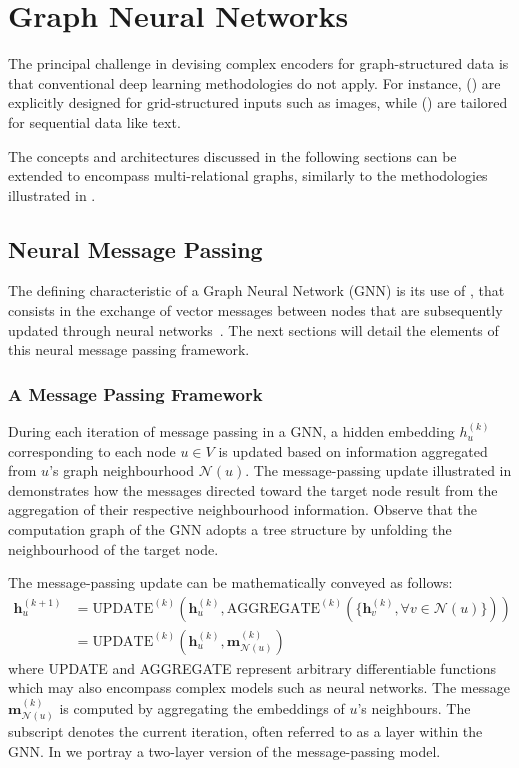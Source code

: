 \section{Graph Neural Networks}\label{sec:gnn}
The principal challenge in devising complex encoders for graph-structured data is that conventional deep learning methodologies do not apply. For instance,  () are explicitly designed for grid-structured inputs such as images, while  () are tailored for sequential data like text.

The concepts and architectures discussed in the following sections can be extended to encompass multi-relational graphs, similarly to the methodologies illustrated in .

\subsection{Neural Message Passing}
The defining characteristic of a Graph Neural Network (GNN) is its use of , that consists in the exchange of vector messages between nodes that are subsequently updated through neural networks~\cite{Gilmer2017neuralMessagePassing}. The next sections will detail the elements of this neural message passing framework.

\subsubsection{A Message Passing Framework}
During each iteration of message passing in a GNN, a hidden embedding $ h_u^{(k)} $ corresponding to each node $ u \in V $ is updated based on information aggregated from $ u $’s graph neighbourhood $ \mathcal{N}(u) $. The message-passing update illustrated in  demonstrates how the messages directed toward the target node result from the aggregation of their respective neighbourhood information. Observe that the computation graph of the GNN adopts a tree structure by unfolding the neighbourhood of the target node.



The message-passing update can be mathematically conveyed as follows:
\begin{align}\label{eq:GNNupdate}
    \mathbf{h}_u^{(k+1)} &= \text{UPDATE}^{(k)}\left(\mathbf{h}_u^{(k)}, \text{AGGREGATE}^{(k)}(\{\mathbf{h}_v^{(k)}, \forall v \in \mathcal{N}(u)\})\right) \\
    &= \text{UPDATE}^{(k)}\left(\mathbf{h}_u^{(k)}, \mathbf{m}_{\mathcal{N}(u)}^{(k)}\right)
\end{align}
where UPDATE and AGGREGATE represent arbitrary differentiable functions which may also encompass complex models such as neural networks. The message $ \mathbf{m}_{\mathcal{N}(u)}^{(k)} $ is computed by aggregating the embeddings of $ u $'s neighbours. The subscript denotes the current iteration, often referred to as a layer within the GNN. In  we portray a two-layer version of the message-passing model.

